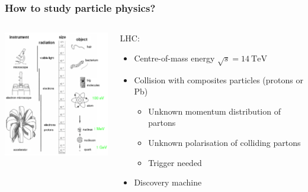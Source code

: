 \documentclass{beamer}
\begin{document}
    \begin{frame}
    \frametitle{How to study particle physics?}

    \begin{columns}[c]
      \begin{column}{5cm}
        \centering
        \includegraphics[width = 5cm]{Pictures/instrument.png}
      \end{column}
      
      \begin{column}{5cm}
        \begin{block}{LHC:}
          \begin{itemize}
            \item Centre-of-mass energy $\sqrt{s} = 14~\text{TeV}$
            \item Collision with composites particles (protons or Pb)
                \begin{itemize}
                    \item Unknown momentum distribution of partons
                    \item Unknown polarisation of colliding partons
                    \item Trigger needed
                \end{itemize}
            \item Discovery machine
          \end{itemize}
        \end{block}
      \end{column}
    \end{columns}

  \end{frame}


\end{document}

